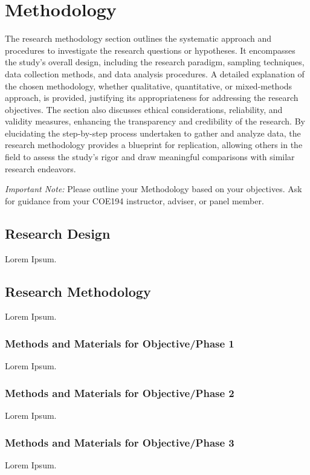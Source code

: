 
\renewcommand{\thechapter}{\Roman{chapter}}
\chapter{Methodology}
    \thispagestyle{empty} 
    \renewcommand{\thechapter}{\arabic{chapter}}

    The research methodology section outlines the systematic approach and procedures to investigate the research questions or hypotheses. It encompasses the study's overall design, including the research paradigm, sampling techniques, data collection methods, and data analysis procedures. A detailed explanation of the chosen methodology, whether qualitative, quantitative, or mixed-methods approach, is provided, justifying its appropriateness for addressing the research objectives. The section also discusses ethical considerations, reliability, and validity measures, enhancing the transparency and credibility of the research. By elucidating the step-by-step process undertaken to gather and analyze data, the research methodology provides a blueprint for replication, allowing others in the field to assess the study's rigor and draw meaningful comparisons with similar research endeavors.

    \textit{Important Note:} Please outline your Methodology based on your objectives. Ask for guidance from your COE194 instructor, adviser, or panel member.

\section{Research Design}
    Lorem Ipsum.

\section{Research Methodology}
    Lorem Ipsum.

\subsection{Methods and Materials for Objective/Phase 1}
    Lorem Ipsum.

\subsection{Methods and Materials for Objective/Phase 2}
    Lorem Ipsum.

\subsection{Methods and Materials for Objective/Phase 3}
    Lorem Ipsum.

